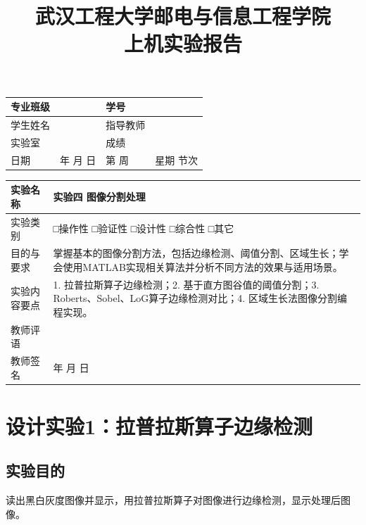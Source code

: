 \documentclass[12pt,a4paper]{article}
\title{\vspace{-1cm}\textbf{武汉工程大学邮电与信息工程学院}\\\textbf{上机实验报告}}
\author{}
\date{}
\begin{document}
	
	\maketitle
	\vspace{-1cm}
	
	\begin{table}[H]
		\centering
		\begin{tabular}{|p{2.5cm}|p{4cm}|p{2.5cm}|p{4cm}|}
			\hline
			专业班级 & \hfill  & 学号 & \hfill  \\
			\hline
			学生姓名 & \hfill  & 指导教师 & \hfill  \\
			\hline
			实验室 & \hfill  & 成绩 & \hfill  \\
			\hline
			日期 & \hfill 年 \hfill 月 \hfill 日 & 第 \hfill 周 & 星期 \hfill 节次 \\
			\hline
		\end{tabular}
	\end{table}
	
	\vspace{0.5cm}
	
	\begin{table}[H]
		\centering
		\begin{tabular}{|p{3cm}|p{10cm}|}
			\hline
			实验名称 & 实验四 图像分割处理 \\
			\hline
			实验类别 & □操作性  □验证性  □设计性  □综合性  □其它 \\
			\hline
			目的与要求 & 掌握基本的图像分割方法，包括边缘检测、阈值分割、区域生长；学会使用MATLAB实现相关算法并分析不同方法的效果与适用场景。 \\
			\hline
			实验内容要点 & 1. 拉普拉斯算子边缘检测；2. 基于直方图谷值的阈值分割；3. Roberts、Sobel、LoG算子边缘检测对比；4. 区域生长法图像分割编程实现。 \\
			\hline
			教师评语 & \\
			\hline
			教师签名 & \hspace{2cm} 年 \hspace{1cm} 月 \hspace{1cm} 日 \\
			\hline
		\end{tabular}
	\end{table}
	
	\newpage
	
	\section{设计实验1：拉普拉斯算子边缘检测}
	
	\subsection{实验目的}
	读出黑白灰度图像并显示，用拉普拉斯算子对图像进行边缘检测，显示处理后图像。
	
\end{document}

